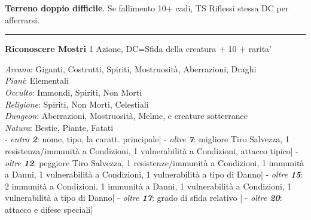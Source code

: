\documentclass[a4paper,12 pt,openany]{book}
\newcommand{\riga}{\rule{\textwidth}{0.4pt}}
\begin{document}
\begin{textblock*}{7.4cm}
\textbf{Terreno doppio difficile}. Se fallimento 10+ cadi, TS Riflessi stessa DC per afferrarsi.

\riga


\textbf{Riconoscere Mostri} 1 Azione, 	DC=Sfida della creatura + 10 + rarita'
	
\textit{Arcana}: Giganti, Costrutti, Spiriti, Mostruosità, Aberrazioni, Draghi\\
\textit{Piani}: Elementali\\
\textit{Occulto}: Immondi, Spiriti, Non Morti\\
\textit{Religione}: Spiriti, Non Morti, Celestiali\\
\textit{Dungeon}: Aberrazioni, Mostruosità, Melme, e creature sotterranee\\
\textit{Natura}: Bestie, Piante, Fatati\\
	
- \textit{entro \textbf{2}}: nome, tipo, la caratt. principale|
- \textit{oltre \textbf{7}}: migliore Tiro Salvezza, 1 resistenza/immunità a Condizioni, 1 vulnerabilità a Condizioni, attacco tipico|
- \textit{oltre \textbf{12}}: peggiore Tiro Salvezza, 1 resistenze/immunità a Condizioni, 1 immunità a Danni, 1 vulnerabilità a Condizioni, 1 vulnerabilità a tipo di Danno|
- \textit{oltre \textbf{15}}: 2 immunità a Condizioni, 1 immunità a Danni, 1 vulnerabilità a Condizioni, 1 vulnerabilità a tipo di Danno|
- \textit{oltre \textbf{17}}: grado di sfida relativo |
- \textit{oltre \textbf{20}}: attacco e difese speciali|
	

\end{textblock*}
\end{document}
